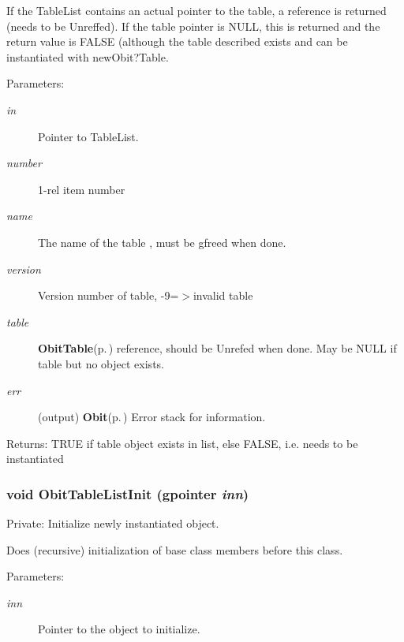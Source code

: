 If the Table\-List contains an actual pointer to the table, a reference is returned (needs to be Unreffed). If the table pointer is NULL, this is returned and the return value is FALSE (although the table described exists and can be instantiated with new\-Obit?Table. \begin{Desc}
\item[Parameters:]
\begin{description}
\item[{\em in}]Pointer to Table\-List. \item[{\em number}]1-rel item number \item[{\em name}]The name of the table , must be gfreed when done. \item[{\em version}]Version number of table, -9=$>$invalid table \item[{\em table}]{\bf Obit\-Table}{\rm (p.\,\pageref{structObitTable})} reference, should be Unrefed when done. May be NULL if table but no object exists. \item[{\em err}](output) {\bf Obit}{\rm (p.\,\pageref{structObit})} Error stack for information. \end{description}
\end{Desc}
\begin{Desc}
\item[Returns:]TRUE if table object exists in list, else FALSE, i.e. needs to be instantiated \end{Desc}
\subsubsection{\setlength{\rightskip}{0pt plus 5cm}void Obit\-Table\-List\-Init (gpointer {\em inn})}\label{ObitTableList_8c_a3}


Private: Initialize newly instantiated object. 

Does (recursive) initialization of base class members before this class. \begin{Desc}
\item[Parameters:]
\begin{description}
\item[{\em inn}]Pointer to the object to initialize. \end{description}
\end{Desc}
